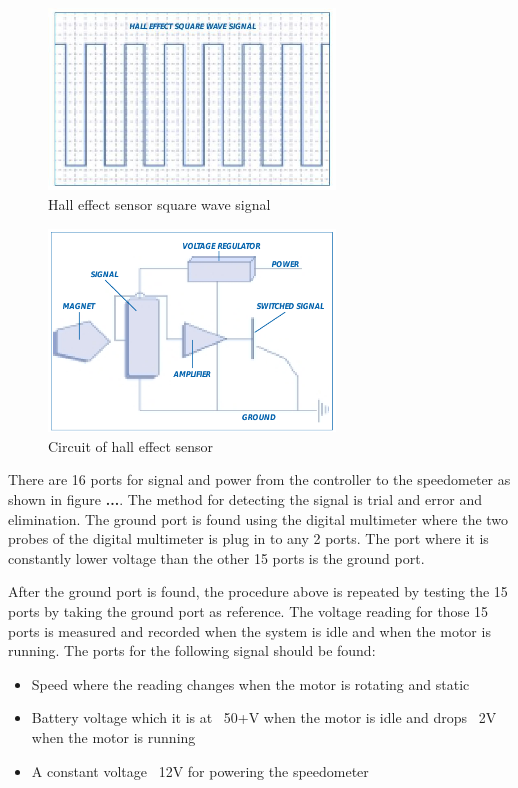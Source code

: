 \begin{figure} [htb]
	\centering
	\includegraphics[width=3in]{images/hall_effect_signals.jpg}
	\caption{Hall effect sensor square wave signal \citep{counterpoint31}}
	\label{im:hall_signal}
\end{figure}

\begin{figure} [htb]
	\centering
	\includegraphics[width=3in]{images/hall_sensor_circuit.png}
	\caption{Circuit of hall effect sensor \citep{counterpoint31}}
	\label{im:hall_circuit}
\end{figure}

There are 16 ports for signal and power from the controller to the speedometer as shown in figure \textbf{...}. The method for detecting the signal is trial and error and elimination. The ground port is found using the digital multimeter where the two probes of the digital multimeter is plug in to any 2 ports. The port where it is constantly lower voltage than the other 15 ports is the ground port.

After the ground port is found, the procedure above is repeated by testing the 15 ports by taking the ground port as reference. The voltage reading for those 15 ports is measured and recorded when the system is idle and when the motor is running. The ports for the following signal should be found:

\begin{itemize}
	\item{Speed where the reading changes when the motor is rotating and static}
	\item{Battery voltage which it is at ~50+V when the motor is idle and drops ~2V when the motor is running}
	\item{A constant voltage ~12V for powering the speedometer}
\end{itemize}


